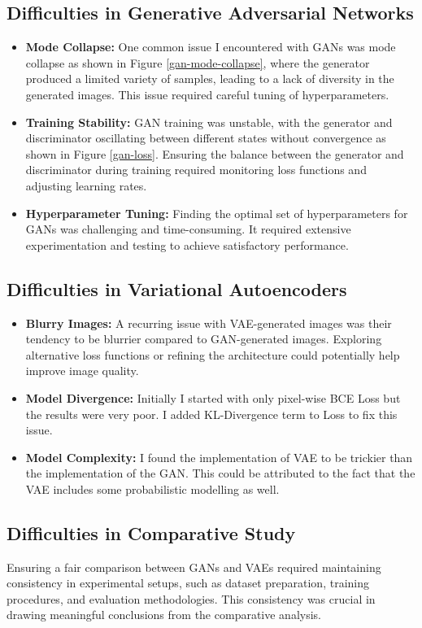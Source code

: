\documentclass{article}
\begin{document}
\subsection{Difficulties in Generative Adversarial Networks}
\begin{itemize}
    \item \textbf{Mode Collapse:} One common issue I encountered with GANs was mode collapse as shown in Figure \ref{gan-mode-collapse}, where the generator produced a limited variety of samples, leading to a lack of diversity in the generated images. This issue required careful tuning of hyperparameters.
    \item \textbf{Training Stability:} GAN training was unstable, with the generator and discriminator oscillating between different states without convergence as shown in Figure \ref{gan-loss}. Ensuring the balance between the generator and discriminator during training required monitoring loss functions and adjusting learning rates.
    \item \textbf{Hyperparameter Tuning:} Finding the optimal set of hyperparameters for GANs was challenging and time-consuming. It required extensive experimentation and testing to achieve satisfactory performance.
\end{itemize}

\subsection{Difficulties in Variational Autoencoders}
\begin{itemize}
    \item \textbf{Blurry Images:} A recurring issue with VAE-generated images was their tendency to be blurrier compared to GAN-generated images. Exploring alternative loss functions or refining the architecture could potentially help improve image quality.
    \item \textbf{Model Divergence:} Initially I started with only pixel-wise BCE Loss but the results were very poor. I added KL-Divergence term to Loss to fix this issue.
    \item \textbf{Model Complexity:} I found the implementation of VAE to be trickier than the implementation of the GAN. This could be attributed to the fact that the VAE includes some probabilistic modelling as well.
\end{itemize}

\subsection{Difficulties in Comparative Study}
Ensuring a fair comparison between GANs and VAEs required maintaining consistency in experimental setups, such as dataset preparation, training procedures, and evaluation methodologies. This consistency was crucial in drawing meaningful conclusions from the comparative analysis.
\end{document}
